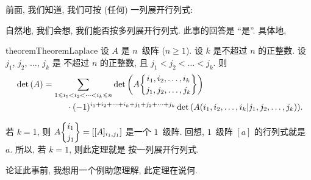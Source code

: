 \documentclass[../libro.tex]{subfiles}
\begin{document}
\maldevigalegajxo

前面, 我们知道, 我们可按 (任何) 一列展开行列式:

\TheoremExpansionAboutAnyColumn*

自然地, 我们会想, 我们能否按多列展开行列式.
此事的回答是 ``是''.
具体地,

\begin{restatable}{theorem}{TheoremLaplace}
    设 \(A\) 是 \(n\)~级阵 (\(n \geq 1\)).
    设 \(k\) 是不超过 \(n\) 的正整数.
    设 \(j_1\), \(j_2\), \(\dots\), \(j_k\) 是%
    不超过 \(n\) 的正整数,
    且 \(j_1 < j_2 < \dots < j_k\).
    则
    \begin{align*}
        &
        \det {(A)}
        = \sum_{1 \leq i_1 < i_2 < \dots < i_k \leq n}
        {\det {\left(
                    A\submat{i_1, i_2, \dots, i_k}
                    {j_1, j_2, \dots, j_k}
        \right)}}
        \\
        &
        \qquad \qquad \qquad
        \cdot (-1)^{i_1 + i_2 + \dots + i_k
        + j_1 + j_2 + \dots + j_k}
        \det {(A({i_1,i_2,\dots,i_k}|{j_1,j_2,\dots,j_k}))}.
    \end{align*}
\end{restatable}

若 \(k = 1\), 则
\(A\submat{i_1}{j_1} = [[A]_{i_1,j_1}]\)
是一个 \(1\)~级阵.
回想, \(1\)~级阵 \([a]\) 的行列式就是 \(a\).
所以, 若 \(k = 1\), 则此定理就是%
按一列展开行列式.

论证此事前, 我想用一个例助您理解, 此定理在说何.
\end{document}
